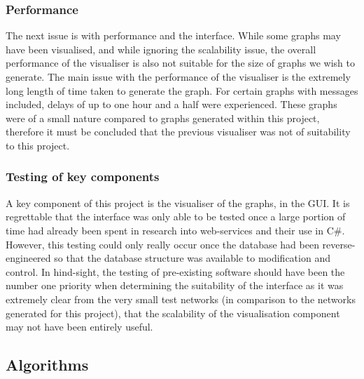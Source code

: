 \subsubsection{Performance}

The next issue is with performance and the interface. While some graphs may have been visualised, and while ignoring the scalability issue, the overall performance of the visualiser is also not suitable for the size of graphs we wish to generate. The main issue with the performance of the visualiser is the extremely long length of time taken to generate the graph. For certain graphs with messages included, delays of up to one hour and a half were experienced. These graphs were of a small nature compared to graphs generated within this project, therefore it must be concluded that the previous visualiser was not of suitability to this project.

\subsubsection{Testing of key components}

A key component of this project is the visualiser of the graphs, in the GUI. It is regrettable that the interface was only able to be tested once a large portion of time had already been spent in research into web-services and their use in C\#. However, this testing could only really occur once the database had been reverse-engineered so that the database structure was available to modification and control. In hind-sight, the testing of pre-existing software should have been the number one priority when determining the suitability of the interface as it was extremely clear from the very small test networks (in comparison to the networks generated for this project), that the scalability of the visualisation component may not have been entirely useful.

\subsection{Algorithms}

